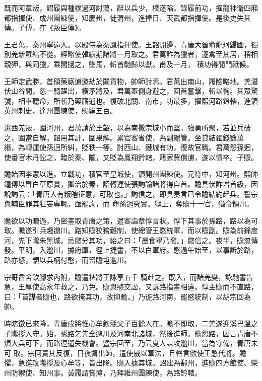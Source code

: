 \begin{pinyinscope}
 既而阿章叛，詔履與種樸過河討蕩，辭以兵少，樸遂陷。錄履前功，擢龍神衛四廂都指揮使、成州團練使，知慶州，徙渭州，進捧日、天武都指揮使。是後史失其傳。子傅，在《叛臣傳》。



 王君萬，秦州寧遠人。以殿侍為秦鳳指揮使。王韶開邊，青唐大酋俞龍珂歸國，獨別羌新羅結不從。經略使韓縝期諸將一月取之。君萬詐為獵者，逐禽至其居，稍相親狎，與同獵，乘間撾之，墜馬，斬首馳歸以獻。甫及一月，
 積功得閣門祗候。



 王師定武勝，首領藥廝逋邀劫於闐貢物，帥師討焉。君萬出南山，履險略地。羌潛伏山谷間，忽一騎躍出，橫矛將及，君萬亟側身避之，回首奮擊，斬以徇。其眾驚號，相率聽命，所斬乃藥廝逋也。復破北關、南市，功最多，擢熙河路鈐轄，進領英州刺史、達州團練使，賜絹五百。



 洮西羌叛，圍河州，君萬請於王韶，以為南撒宗城小而堅，強勇所聚，若並兵破之，圍當自解。韶用其計，圍果解。累官客省使，為副總管。坐貸結糴錢數萬
 緡，為轉運使孫迥所糾，貶秩一等。討西山、鐵城有功，復故官職。君萬怨孫迥，使番官木丹訟之，鞫於秦、隴，又貶為鳳翔鈐轄，籍家貲償逋，遂以憤卒。子贍。



 贍始因李憲以進。立戰功，積官至皇城使，領開州團練使。元符中，知河州。熙帥鐘傅以冒白草原賞，獄治於秦，詔轉運使張詢諭諸將得自首。贍具伏詐增首級，因說詢云：「青唐人有叛瞎征意，可取也。」詢信之，即具奏言已令贍結約起兵。誓宗與輔臣罪其狂妄專輒，亟罷詢，而
 命孫迥究實。獄上，奪贍十一官，猶令領州。



 贍欲以功贖過，乃密畫取青唐之策，遣客詣章惇言狀。惇下其事於孫路，路以為可取。贍遂引兵趣邈川。路知贍狡獪難制，使總管王愍統軍，而以贍副。贍為前鋒度河，先下隴朱黑城。忌愍分其功，紿之曰：「晨食畢乃發。」愍信之。夜半，贍忽傳發。平明，入邈川，據府庫，徑上捷書，不以白軍府。愍過午始至，以事訴於路，路亦怒，顓以兵柄付愍，而留贍屯邈川。



 宗哥酋舍欽腳求內附，贍遣裨將王詠享五千
 騎赴之。既入，而諸羌變，詠馳書告急，王厚使高永年救之，乃免。贍與愍交訟，又訴路指畫相違。惇主贍而不直路，曰：「首謀者贍也，路欲掩其功，故抑贍。」乃徙路河南，罷愍統制，以胡宗回為帥。



 時瞎徵已來降，青唐戍將惟心牟欽氈父子百餘人在。贍不即取，二羌遂迎溪巴溫之子隴拶入守。始，孫路乞先全邈川及河南北諸城，然後進師。贍怨路，因言青唐不煩大兵可下，而路逗遛失機會。暨宗回至，乃云夏人謀攻邈川，當為守備，青唐未可
 取。宗回責其反復，日夜督出師，遣使威以軍法，且聲言欲使王愍代將。贍懼，急進攻隴拶及心牟等，皆出降。贍入據其城。詔建為鄯州，進贍四方館使、榮州防禦使、知州事。黃履謂賞薄，乃拜維州團練使，為路鈐轄。




\end{pinyinscope}
